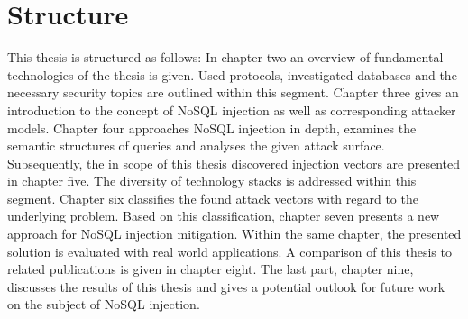 \section{Structure}
This thesis is structured as follows: In chapter two an overview of fundamental technologies of the thesis is given. Used protocols, investigated databases and the necessary security topics are outlined within this segment. Chapter three gives an introduction to the concept of NoSQL injection as well as corresponding attacker models. Chapter four approaches NoSQL injection in depth, examines the semantic structures of queries and analyses the given attack surface. Subsequently, the in scope of this thesis discovered injection vectors are presented in chapter five. The diversity of technology stacks is addressed within this segment. Chapter six classifies the found attack vectors with regard to the underlying problem. Based on this classification, chapter seven presents a new approach for NoSQL injection mitigation. Within the same chapter, the presented solution is evaluated with real world applications. A comparison of this thesis to related publications is given in chapter eight. The last part, chapter nine, discusses the results of this thesis and gives a potential outlook for future work on the subject of NoSQL injection.